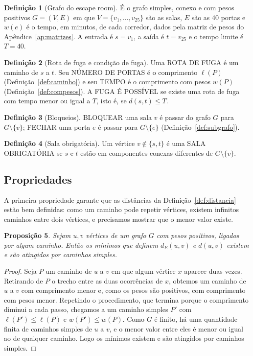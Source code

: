 \documentclass{article}
\theoremstyle{definition}
\newtheorem{definicao}{Definição}[section]
\theoremstyle{plain}
\newtheorem{proposicao}[definicao]{Proposição}
\newcommand{\dE}{d_E}
\begin{document}
\begin{definicao}[Grafo do escape room]\label{def:escape}
É o grafo simples, conexo e com pesos positivos $G=(V,E)$ em que
$V = \{v_1, \dots, v_{25}\}$ são as salas, $E$ são as 40 portas e $w(e)$ é o tempo,
em minutos, de cada corredor, dados pela matriz de pesos do
Apêndice~\ref{ap:matrizes}. A entrada é $s = v_1$, a saída é $t = v_{25}$ e o tempo
limite é $T = 40$.
\end{definicao}

\begin{definicao}[Rota de fuga e condição de fuga]\label{def:fuga}
Uma ROTA DE FUGA é um caminho de $s$ a $t$. Seu NÚMERO DE PORTAS é o comprimento
$\ell(P)$ (Definição~\ref{def:caminho}) e seu TEMPO é o comprimento com pesos
$w(P)$ (Definição~\ref{def:compesos}). A FUGA É POSSÍVEL se existe uma rota de
fuga com tempo menor ou igual a $T$, isto é, se $d(s,t) \le T$.
\end{definicao}

\begin{definicao}[Bloqueios]\label{def:bloqueio}
BLOQUEAR uma sala $v$ é passar do grafo $G$ para $G \setminus \{v\}$; FECHAR uma
porta $e$ é passar para $G \setminus \{e\}$ (Definição~\ref{def:subgrafo}).
\end{definicao}

\begin{definicao}[Sala obrigatória]\label{def:obrigatoria}
Um vértice $v \notin \{s,t\}$ é uma SALA OBRIGATÓRIA se $s$ e $t$ estão em
componentes conexas diferentes de $G \setminus \{v\}$.
\end{definicao}

\subsection{Propriedades}

A primeira propriedade garante que as distâncias da Definição~\ref{def:distancia}
estão bem definidas: como um caminho pode repetir vértices, existem infinitos
caminhos entre dois vértices, e precisamos mostrar que o menor valor existe.

\begin{proposicao}\label{prop:simples}
Sejam $u, v$ vértices de um grafo $G$ com pesos positivos, ligados por algum
caminho. Então os mínimos que definem $\dE(u,v)$ e $d(u,v)$ existem e são
atingidos por caminhos simples.
\end{proposicao}

\begin{proof}
Seja $P$ um caminho de $u$ a $v$ em que algum vértice $x$ aparece duas vezes.
Retirando de $P$ o trecho entre as duas ocorrências de $x$, obtemos um caminho de
$u$ a $v$ com comprimento menor e, como os pesos são positivos, com comprimento
com pesos menor. Repetindo o procedimento, que termina porque o comprimento
diminui a cada passo, chegamos a um caminho simples $P'$ com
$\ell(P') \le \ell(P)$ e $w(P') \le w(P)$. Como $G$ é finito, há uma quantidade
finita de caminhos simples de $u$ a $v$, e o menor valor entre eles é menor ou
igual ao de qualquer caminho. Logo os mínimos existem e são atingidos por caminhos
simples.
\end{proof}
\end{document}
